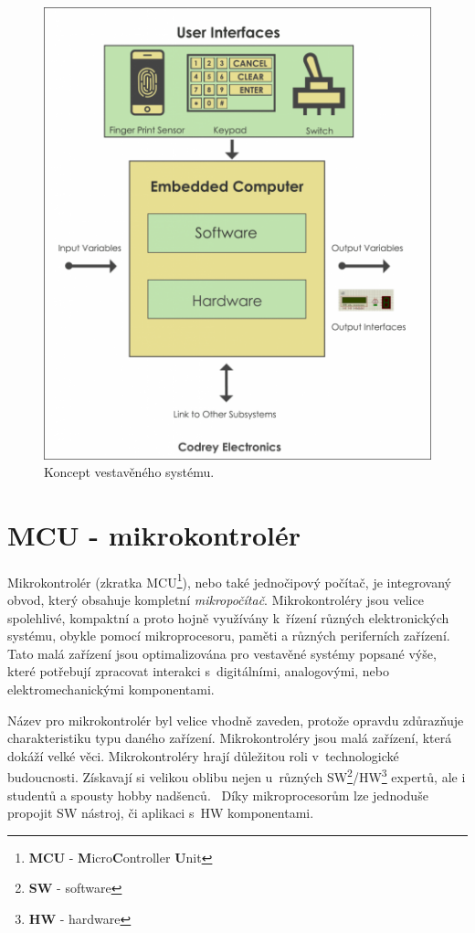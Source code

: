 \begin{figure}[hbt]
  \centering
  \includegraphics[width=.6 \linewidth]{obrazky-figures/embedded_system.png}
  \caption{
    Koncept vestavěného systému.~\cite{embedded:figure}
  }
  \label{figure:embedded}
\end{figure}

\newpage
\section{MCU - mikrokontrolér}
\label{terminy:mcu}

Mikrokontrolér (zkratka MCU\footnote{\textbf{MCU} - \textbf{M}icro\textbf{C}ontroller \textbf{U}nit}), nebo také jednočipový počítač, je integrovaný obvod, který obsahuje kompletní \emph{mikropočítač}.
Mikrokontroléry jsou velice spolehlivé, kompaktní a proto hojně využívány k~řízení různých elektronických systému, obykle pomocí mikroprocesoru, paměti a různých periferních zařízení.
Tato malá zařízení jsou optimalizována pro vestavěné systémy popsané výše, které potřebují zpracovat interakci s~digitálními, analogovými, nebo elektromechanickými komponentami.

Název pro mikrokontrolér byl velice vhodně zaveden, protože opravdu zdůrazňuje charakteristiku typu daného zařízení. Mikrokontroléry jsou malá zařízení, která dokáží velké věci.
Mikrokontroléry hrají důležitou roli v~technologické budoucnosti. Získavají si velikou oblibu nejen u~různých SW\footnote{\textbf{SW} - software}/HW\footnote{\textbf{HW} - hardware} expertů, ale i studentů a spousty hobby nadšenců.~\cite{mcu:info}
Díky mikroprocesorům lze jednoduše propojit SW nástroj, či aplikaci s~HW komponentami.

